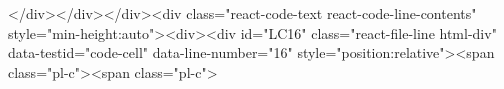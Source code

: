 {{{{{{{{{{{{{{{{{{{{{{{{{{{{{{{</div></div></div><div class="react-code-text react-code-line-contents" style="min-height:auto"><div><div id="LC16" class="react-file-line html-div" data-testid="code-cell" data-line-number="16" style="position:relative"><span class="pl-c"><span class="pl-c">%
}}}}}}}}}}}}}}}}}}}}}}}}}}}}}}}
